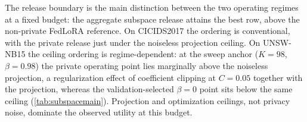 \documentclass[a4paper,fleqn]{cas-dc}
\begin{document}
\par
\par
The release boundary is the main distinction between the two operating
regimes at a fixed budget: the aggregate subspace release attains the best
row, above the non-private FedLoRA reference. On CICIDS2017 the ordering is
conventional, with the private release just under the noiseless projection
ceiling. On UNSW-NB15 the ceiling ordering is regime-dependent: at the sweep
anchor ($K=98$, $\beta=0.98$) the private operating point lies marginally
above the noiseless projection, a regularization effect of coefficient
clipping at $C=0.05$ together with the projection, whereas the
validation-selected $\beta=0$ point sits below the same ceiling
(\cref{tab:subspacemain}). Projection and optimization ceilings, not
privacy noise, dominate the observed utility at this budget.
\par
\end{document}
